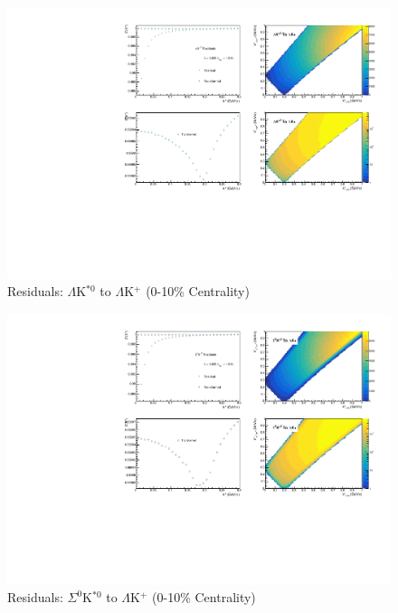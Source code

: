 \documentclass[../AnalysisNoteJBuxton.tex]{subfiles}
\begin{document}
\begin{figure}[h]
  \centering
  \includegraphics[width=\textwidth]{9_AdditionalFigures/Figures/Residuals/LamKchP/Residuals_LamKchP_0010_LamKSt0_MomResCrctn_NonFlatBgdCrctn_10Res_PrimMaxDecay4fm_UsingXiDataAndCoulombOnly.pdf}
  \caption[Residuals: $\Lambda$K$^{*0}$ to $\Lambda$K$^{+}$ (0-10\% Centrality)]{Residuals: $\Lambda$K$^{*0}$ to $\Lambda$K$^{+}$ (0-10\% Centrality)}
  \label{fig:Res_LamKchP_0010_LamKSt0}
\end{figure}


\begin{figure}[h]
  \centering
  \includegraphics[width=\textwidth]{9_AdditionalFigures/Figures/Residuals/LamKchP/Residuals_LamKchP_0010_Sig0KSt0_MomResCrctn_NonFlatBgdCrctn_10Res_PrimMaxDecay4fm_UsingXiDataAndCoulombOnly.pdf}
  \caption[Residuals: $\Sigma^{0}$K$^{*0}$ to $\Lambda$K$^{+}$ (0-10\% Centrality)]{Residuals: $\Sigma^{0}$K$^{*0}$ to $\Lambda$K$^{+}$ (0-10\% Centrality)}
  \label{fig:Res_LamKchP_0010_Sig0KSt0}
\end{figure}
\end{document}
